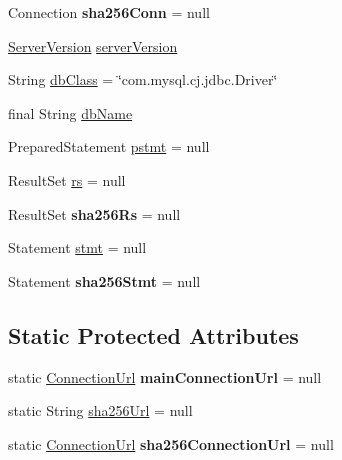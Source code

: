 \begin{DoxyCompactItemize}
\item 
\mbox{\label{classtestsuite_1_1_base_test_case_a5bd183a70ffca96d160794ac4a6250a4}} 
Connection {\bfseries sha256\+Conn} = null
\item 
\mbox{\hyperlink{classcom_1_1mysql_1_1cj_1_1_server_version}{Server\+Version}} \mbox{\hyperlink{classtestsuite_1_1_base_test_case_a755284d3321cf420b44afe8b3d908bee}{server\+Version}}
\item 
String \mbox{\hyperlink{classtestsuite_1_1_base_test_case_ab78915f48e4a877fab1ace666b20f68a}{db\+Class}} = \char`\"{}com.\+mysql.\+cj.\+jdbc.\+Driver\char`\"{}
\item 
final String \mbox{\hyperlink{classtestsuite_1_1_base_test_case_af8fcaf72777e1ea5ace44da305092f02}{db\+Name}}
\item 
Prepared\+Statement \mbox{\hyperlink{classtestsuite_1_1_base_test_case_ad11201d39ce60fd541a261cac7d9a889}{pstmt}} = null
\item 
Result\+Set \mbox{\hyperlink{classtestsuite_1_1_base_test_case_a31fa73417c178b2baaf37ef1362e37d9}{rs}} = null
\item 
\mbox{\label{classtestsuite_1_1_base_test_case_a0b42d16fb351a34cb4c1f0119e93b5d1}} 
Result\+Set {\bfseries sha256\+Rs} = null
\item 
Statement \mbox{\hyperlink{classtestsuite_1_1_base_test_case_a47db7db62d10e395144b1210dc7fd337}{stmt}} = null
\item 
\mbox{\label{classtestsuite_1_1_base_test_case_a774269ef0c9a559079dfeaf3be301d28}} 
Statement {\bfseries sha256\+Stmt} = null
\end{DoxyCompactItemize}
\subsection*{Static Protected Attributes}
\begin{DoxyCompactItemize}
\item 
\mbox{\label{classtestsuite_1_1_base_test_case_ae0530f6fd002f79b22ec32bef921884b}} 
static \mbox{\hyperlink{classcom_1_1mysql_1_1cj_1_1conf_1_1_connection_url}{Connection\+Url}} {\bfseries main\+Connection\+Url} = null
\item 
static String \mbox{\hyperlink{classtestsuite_1_1_base_test_case_aa0a3676bf28f60f30f04e5ec95327ddd}{sha256\+Url}} = null
\item 
\mbox{\label{classtestsuite_1_1_base_test_case_a73f65678fa7d11111d0fa7d5ab5b7aa0}} 
static \mbox{\hyperlink{classcom_1_1mysql_1_1cj_1_1conf_1_1_connection_url}{Connection\+Url}} {\bfseries sha256\+Connection\+Url} = null
\end{DoxyCompactItemize}


